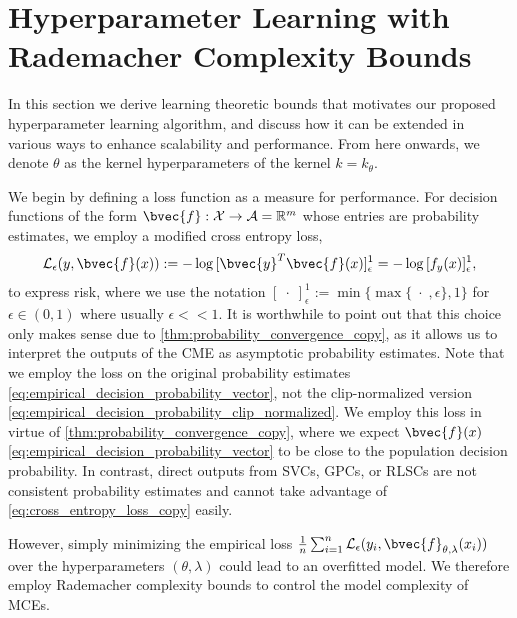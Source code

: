 \documentclass{llncs}
\begin{document}
	\section{Hyperparameter Learning with Rademacher Complexity Bounds}
	\label{sec:hyperparameter_learning}
	
	In this section we derive learning theoretic bounds that motivates our proposed hyperparameter learning algorithm, and discuss how it can be extended in various ways to enhance scalability and performance. From here onwards, we denote $\theta$ as the kernel hyperparameters of the kernel $k = k_{\theta}$.
	
	We begin by defining a loss function as a measure for performance. For decision functions of the form $\bvec{f} : \mathcal{X} \to \mathcal{A} = \mathbb{R}^{m}$ whose entries are probability estimates, we employ a modified cross entropy loss,
	\begin{equation}
	\mathcal{L}_{\epsilon}(y, \bvec{f}(x)) := - \log{ [\bvec{y}^{T} \bvec{f}(x)]_{\epsilon}^{1} } = - \log{ [f_{y}(x)]_{\epsilon}^{1} },
	\label{eq:cross_entropy_loss_copy}
	\end{equation}
	to express risk, where we use the notation $[\;\cdot\;]_{\epsilon}^{1} := \min\{\max\{\;\cdot\;, \epsilon\}, 1\}$ for $\epsilon \in (0, 1)$ where usually $\epsilon << 1$. It is worthwhile to point out that this choice only makes sense due to \cref{thm:probability_convergence_copy}, as it allows us to interpret the outputs of the \gls{CME} as asymptotic probability estimates. Note that we employ the loss on the original probability estimates \eqref{eq:empirical_decision_probability_vector}, not the clip-normalized version \eqref{eq:empirical_decision_probability_clip_normalized}. We employ this loss in virtue of \cref{thm:probability_convergence_copy}, where we expect $\bvec{f}(x)$ \eqref{eq:empirical_decision_probability_vector} to be close to the population decision probability. In contrast, direct outputs from \glspl{SVC}, \glspl{GPC}, or \glspl{RLSC} are not consistent probability estimates and cannot take advantage of \eqref{eq:cross_entropy_loss_copy} easily.
	
	However, simply minimizing the empirical loss $\frac{1}{n} \sum_{i = 1}^{n} \mathcal{L}_{\epsilon}(y_{i}, \bvec{f}_{\theta, \lambda}(x_{i}))$ over the hyperparameters $(\theta, \lambda)$ could lead to an overfitted model. We therefore employ Rademacher complexity bounds to control the model complexity of \glspl{MCE}.
	
\end{document}
